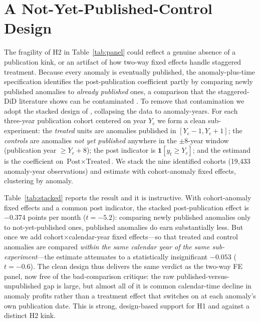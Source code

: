 \documentclass[12pt]{article}
\begin{document}
\section{A Not-Yet-Published-Control Design}\label{sec:stacked}
The fragility of H2 in Table~\ref{tab:panel} could reflect a genuine absence of a publication
kink, or an artifact of how two-way fixed effects handle staggered treatment. Because every
anomaly is eventually published, the anomaly-plus-time specification identifies the
post-publication coefficient partly by comparing newly published anomalies to \emph{already
published} ones, a comparison that the staggered-DiD literature shows can be
contaminated \citep{goodmanbacon2021,callaway2021}. To remove that contamination we adopt the
stacked design of \citet{cengiz2019}, collapsing the data to anomaly-years. For each three-year
publication cohort centered on year $Y_c$ we form a clean sub-experiment: the \emph{treated}
units are anomalies published in $[Y_c-1,Y_c+1]$; the \emph{controls} are anomalies
\emph{not yet published} anywhere in the $\pm 8$-year window (publication year $\ge Y_c+8$); the
post indicator is $\mathbf{1}[y_t\ge Y_c]$; and the estimand is the coefficient on
$\text{Post}\times\text{Treated}$. We stack the nine identified cohorts (19{,}433 anomaly-year
observations) and estimate with cohort-anomaly fixed effects, clustering by anomaly.

Table~\ref{tab:stacked} reports the result and it is instructive. With cohort-anomaly fixed
effects and a common post indicator, the stacked post-publication effect is $-0.374$ points per
month ($t=-5.2$): comparing newly published anomalies only to not-yet-published ones, published
anomalies do earn substantially less. But once we add cohort$\times$calendar-year fixed
effects---so that treated and control anomalies are compared \emph{within the same calendar
year of the same sub-experiment}---the estimate attenuates to a statistically insignificant
$-0.053$ ($t=-0.6$). The clean design thus delivers the same verdict as the two-way FE panel,
now free of the bad-comparison critique: the raw published-versus-unpublished gap is large, but
almost all of it is common calendar-time decline in anomaly profits rather than a treatment
effect that switches on at each anomaly's own publication date. This is strong, design-based
support for H1 and against a distinct H2 kink.
\end{document}
